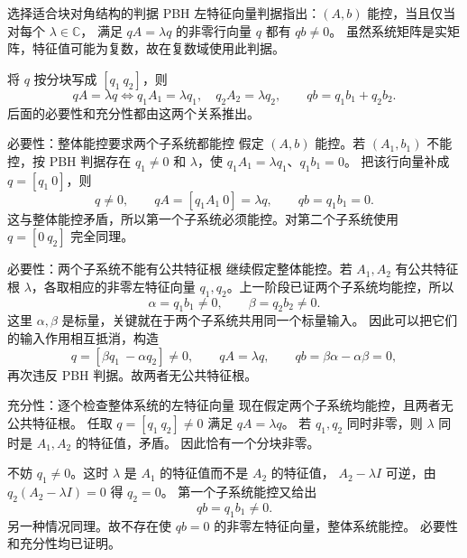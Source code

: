 \documentclass[11pt]{article}
\begin{document}
\begin{solution}
\begin{proofstep}{选择适合块对角结构的判据}
PBH 左特征向量判据指出：$(A,b)$ 能控，当且仅当对每个 $\lambda\in\mathbb C$，
满足 $qA=\lambda q$ 的非零行向量 $q$ 都有 $qb\ne0$。
虽然系统矩阵是实矩阵，特征值可能为复数，故在复数域使用此判据。

将 $q$ 按分块写成 $[q_1\ q_2]$，则
\[
qA=\lambda q
\iff q_1A_1=\lambda q_1,\quad q_2A_2=\lambda q_2,
\qquad qb=q_1b_1+q_2b_2.
\]
后面的必要性和充分性都由这两个关系推出。
\end{proofstep}

\begin{proofstep}{必要性：整体能控要求两个子系统都能控}
假定 $(A,b)$ 能控。若 $(A_1,b_1)$ 不能控，按 PBH 判据存在
$q_1\ne0$ 和 $\lambda$，使 $q_1A_1=\lambda q_1$、$q_1b_1=0$。
把该行向量补成 $q=[q_1\ 0]$，则
\[
q\ne0,\qquad qA=[q_1A_1\ 0]=\lambda q,\qquad qb=q_1b_1=0.
\]
这与整体能控矛盾，所以第一个子系统必须能控。对第二个子系统使用
$q=[0\ q_2]$ 完全同理。
\end{proofstep}

\pagebreak
\begin{proofstep}{必要性：两个子系统不能有公共特征根}
继续假定整体能控。若 $A_1,A_2$ 有公共特征根 $\lambda$，各取相应的非零左特征向量
$q_1,q_2$。上一阶段已证两个子系统均能控，所以
\[
\alpha=q_1b_1\ne0,\qquad \beta=q_2b_2\ne0.
\]
这里 $\alpha,\beta$ 是标量，关键就在于两个子系统共用同一个标量输入。
因此可以把它们的输入作用相互抵消，构造
\[
q=[\beta q_1\ -\alpha q_2]\ne0,\qquad
qA=\lambda q,\qquad qb=\beta\alpha-\alpha\beta=0,
\]
再次违反 PBH 判据。故两者无公共特征根。
\end{proofstep}

\begin{proofstep}{充分性：逐个检查整体系统的左特征向量}
现在假定两个子系统均能控，且两者无公共特征根。
任取 $q=[q_1\ q_2]\ne0$ 满足 $qA=\lambda q$。
若 $q_1,q_2$ 同时非零，则 $\lambda$ 同时是 $A_1,A_2$ 的特征值，矛盾。
因此恰有一个分块非零。

不妨 $q_1\ne0$。这时 $\lambda$ 是 $A_1$ 的特征值而不是 $A_2$ 的特征值，
$A_2-\lambda I$ 可逆，由 $q_2(A_2-\lambda I)=0$ 得 $q_2=0$。
第一个子系统能控又给出
\[
qb=q_1b_1\ne0.
\]
另一种情况同理。故不存在使 $qb=0$ 的非零左特征向量，整体系统能控。
必要性和充分性均已证明。
\end{proofstep}
\end{solution}
\end{document}
